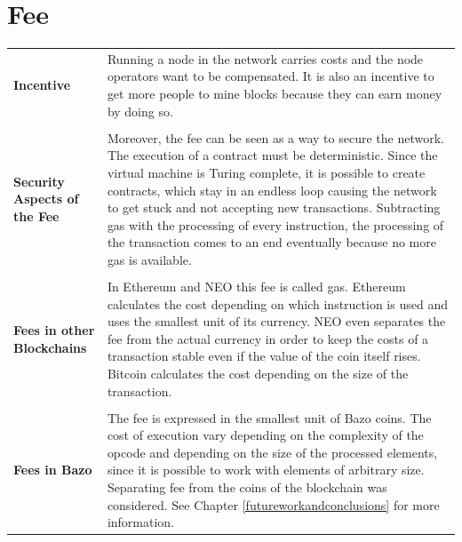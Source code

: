 \section{Fee} \label{fee}
\begin{tabular}[t]{ p{3cm} p{12.5cm}}
\raggedright
\textbf{Incentive} &
Running a node in the network carries costs and the node operators want to be compensated. It is also an incentive to get more people to mine blocks because they can earn money by doing so. \\ \\

\raggedright
\textbf{Security Aspects of the Fee} &
Moreover, the fee can be seen as a way to secure the network. The execution of a contract must be deterministic. Since the virtual machine is Turing complete, it is possible to create contracts, which stay in an endless loop causing the network to get stuck and not accepting new transactions. Subtracting gas with the processing of every instruction, the processing of the transaction comes to an end eventually because no more gas is available. \\ \\

\raggedright
\textbf{Fees in other Blockchains} &
In Ethereum and NEO this fee is called gas. Ethereum calculates the cost depending on which instruction is used and uses the smallest unit of its currency. NEO even separates the fee from the actual currency in order to keep the costs of a transaction stable even if the value of the coin itself rises. Bitcoin calculates the cost depending on the size of the transaction. \\ \\

\raggedright
\textbf{Fees in Bazo} &
The fee is expressed in the smallest unit of Bazo coins. The cost of execution vary depending on the complexity of the opcode and depending on the size of the processed elements, since it is possible to work with elements of arbitrary size. Separating fee from the coins of the blockchain was considered. See Chapter \ref{futureworkandconclusions} for more information.
\end{tabular}

